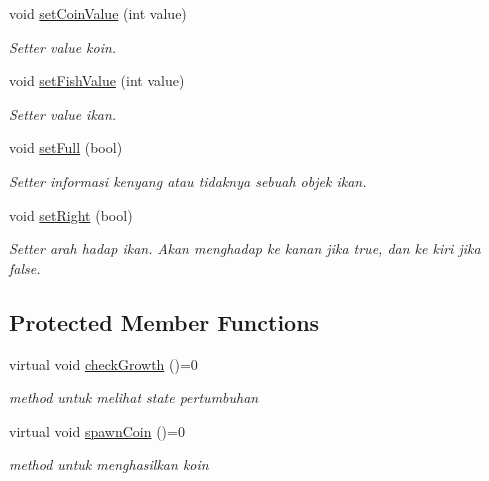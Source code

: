 \begin{DoxyCompactItemize}
void \hyperlink{classFish_ab61f43526d46c7edeee730be29c1eba0}{set\+Coin\+Value} (int value)
\begin{DoxyCompactList}\small\item\em Setter value koin. \end{DoxyCompactList}\item 
\mbox{\label{classFish_af8633a8e349a04e3e1b4ee39e119b1e7}} 
void \hyperlink{classFish_af8633a8e349a04e3e1b4ee39e119b1e7}{set\+Fish\+Value} (int value)
\begin{DoxyCompactList}\small\item\em Setter value ikan. \end{DoxyCompactList}\item 
\mbox{\label{classFish_aeb2dc6cb0b3e0b57a8e458824fdd1d5d}} 
void \hyperlink{classFish_aeb2dc6cb0b3e0b57a8e458824fdd1d5d}{set\+Full} (bool)
\begin{DoxyCompactList}\small\item\em Setter informasi kenyang atau tidaknya sebuah objek ikan. \end{DoxyCompactList}\item 
\mbox{\label{classFish_ad20d93cc7fdc5f560a06d120263feff6}} 
void \hyperlink{classFish_ad20d93cc7fdc5f560a06d120263feff6}{set\+Right} (bool)
\begin{DoxyCompactList}\small\item\em Setter arah hadap ikan. Akan menghadap ke kanan jika true, dan ke kiri jika false. \end{DoxyCompactList}\end{DoxyCompactItemize}
\subsection*{Protected Member Functions}
\begin{DoxyCompactItemize}
\item 
\mbox{\label{classFish_a45d7032d8c2eacedabb8a28799399adb}} 
virtual void \hyperlink{classFish_a45d7032d8c2eacedabb8a28799399adb}{check\+Growth} ()=0
\begin{DoxyCompactList}\small\item\em method untuk melihat state pertumbuhan \end{DoxyCompactList}\item 
\mbox{\label{classFish_acd7cbe8b09a544ca22e92a8edde1bacd}} 
virtual void \hyperlink{classFish_acd7cbe8b09a544ca22e92a8edde1bacd}{spawn\+Coin} ()=0
\begin{DoxyCompactList}\small\item\em method untuk menghasilkan koin \end{DoxyCompactList}\end{DoxyCompactItemize}
